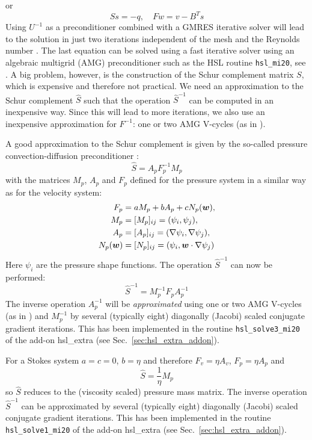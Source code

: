 or
\begin{equation}
  S s = -q,\quad F w = v - B^T s
\end{equation}
Using $U^{-1}$ as a preconditioner combined with a GMRES iterative solver will
lead to the solution in just two iterations independent of the mesh and the
Reynolds number \cite{Elman05}. The last equation can be solved using a fast
iterative solver using an algebraic multigrid (AMG) preconditioner 
such as the HSL routine \texttt{hsl\_mi20}, see \cite{Doyle07}.
A big problem, however, is the construction of the Schur
complement matrix $S$, which is expensive and therefore
not practical. We need an approximation to the Schur complement
$\hat S$ such that the operation $\hat S^{-1}$ can be computed in an
inexpensive way. Since this will lead to more iterations, we also use an
inexpensive approximation for $F^{-1}$: one or two AMG V-cycles (as in
\cite{Kay08}).

A good approximation to the Schur complement is given by the so-called
pressure convection-diffusion preconditioner \cite{Kay08,Elman05}:
\begin{equation}
   \hat S = A_p F_p^{-1}M_p
\end{equation}
with the matrices $M_p$, $A_p$ and $F_p$ defined for the pressure system
in a similar way as for the velocity system:
\begin{align}
   F_p&= a M_p + b A_p + c N_p(\boldsymbol{w}), \\
   M_p&=[M_p]_{ij}=(\psi_i,\psi_j), \\
   A_p&=[A_p]_{ij}=(\nabla\psi_i,\nabla\psi_j),  \\
   N_p(\boldsymbol{w})&=[N_p]_{ij}=(\psi_i,\boldsymbol{w}\cdot\nabla\psi_j)
\end{align}
Here $\psi_i$ are the pressure shape functions.
The operation $\hat S^{-1}$ can now be performed:
\begin{equation}
   \hat S^{-1} = M_p^{-1} F_pA_p^{-1}
   \label{eq:expressS}
\end{equation}
The inverse operation $A_p^{-1}$ will be \emph{approximated}
using one or two AMG
V-cycles (as in \cite{Kay08}) and $M_p^{-1}$ by several (typically eight)
diagonally (Jacobi) scaled conjugate gradient iterations. This has been
implemented in the routine \texttt{hsl\_solve3\_mi20} of the add-on
hsl\_extra (see Sec.~\ref{sec:hsl_extra_addon}).

For a Stokes system $a=c=0$, $b=\eta$ and therefore
 $F_v=\eta A_v$, $F_p=\eta A_p$ and
\begin{equation}
   \hat S = \frac1\eta M_p
\label{eq:stokes_precon}
\end{equation}
so $\hat S$ reduces to the (viscosity scaled) pressure mass matrix.
The inverse operation
$\hat S^{-1}$ can be approximated by several (typically eight)
diagonally (Jacobi) scaled conjugate gradient iterations.
This has been implemented in the routine \texttt{hsl\_solve1\_mi20}
of the add-on hsl\_extra (see Sec.~\ref{sec:hsl_extra_addon}).

